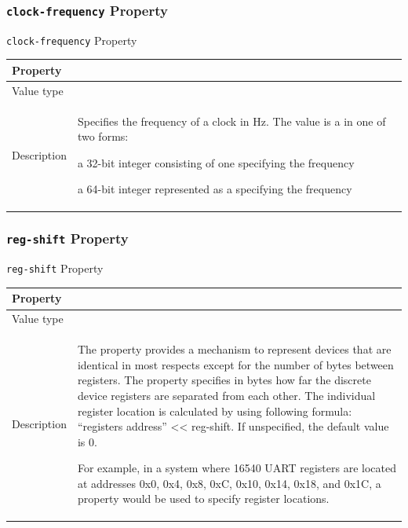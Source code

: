 \documentclass[a4paper,10pt,oneside]{sphinxmanual}
\begin{document}
\subsubsection{\texttt{clock-frequency} Property}
\label{device-bindings:clock-frequency-property}

\begin{threeparttable}
\capstart\caption{\texttt{clock-frequency} Property}\label{device-bindings:id3}
\begin{tabulary}{\linewidth}{| l J |}
\hline
\textsf{\relax 
Property
} & \textsf{\relax 
{}
}\\
\hline
Value type
 & 
\\
\hline
Description
 & 
Specifies the frequency of a clock in Hz. The value is a
 in one of two forms:

a 32-bit integer consisting of one  specifying the
frequency

a 64-bit integer represented as a  specifying the
frequency
\\
\hline\end{tabulary}

\end{threeparttable}



\subsubsection{\texttt{reg-shift} Property}
\label{device-bindings:reg-shift-property}

\begin{threeparttable}
\capstart\caption{\texttt{reg-shift} Property}\label{device-bindings:id4}
\begin{tabulary}{\linewidth}{| l J |}
\hline
\textsf{\relax 
Property
} & \textsf{\relax 
{}
}\\
\hline
Value type
 & 
\\
\hline
Description
 & 
The  property provides a mechanism to represent
devices that are identical in most respects except for the
number of bytes between registers. The  property
specifies in bytes how far the discrete device registers are
separated from each other. The individual register location
is calculated by using following formula: ``registers address''
\textless{}\textless{} reg-shift. If unspecified, the default value is 0.

For example, in a system where 16540 UART registers are
located at addresses 0x0, 0x4, 0x8, 0xC, 0x10, 0x14, 0x18,
and 0x1C, a 
property would be used to specify register locations.
\\
\hline\end{tabulary}

\end{threeparttable}
\end{document}
